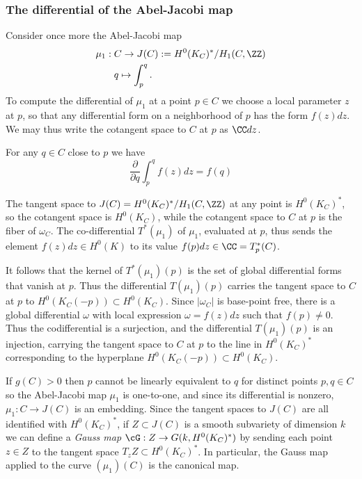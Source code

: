 \subsubsection{The differential of the Abel-Jacobi map}\label{Abel-Jacobi differential}

Consider once more the  Abel-Jacobi map
$$
\begin{aligned}
\mu_1 : \; &C \to J(C) := H^0(K_C)^*/H_1(C, \ZZ) \\
&q \mapsto \int_p^q .
\end{aligned}
$$
To compute the differential of $\mu_1$ at a point $p\in C$ we choose a local parameter $z$ at $p$, so that  any differential form on a neighborhood of $p$ has the form $f(z)dz$. We may thus write the cotangent space to $C$ at $p$ as $\CC dz$.

 For any $q\in C$ close to $p$ we have
$$
\frac{\partial}{\partial q} \int_p^q f(z)dz = f(q)
$$

The tangent space to $J(C) =  H^0(K_C)^*/H_1(C, \ZZ)$ at any point is $H^0(K_C)^*$, so the cotangent space is $H^0(K_C)$, while the cotangent space to $C$ at $p$ is the fiber of $\omega_C$.
The co-differential 
$T^*(\mu_1)$ of $\mu_1$, evaluated at $p$, thus sends the element $f(z) dz\in H^0(K)$ to its value
$f(p)dz \in \CC = T^*_p(C)$. 

It follows that
the kernel of $T^*(\mu_1)(p)$ is  the set of global differential forms that vanish at $p$. Thus the differential $T(\mu_1)(p)$ carries the tangent space to $C$ at $p$ to $H^0(K_C(-p)) \subset H^0(K_C)$. Since $|\omega_C|$ is  base-point free, there is a global differential $\omega$ 
with local expression $\omega = f(z)dz$ such that $f(p) \neq 0$. Thus the codifferential is a surjection, and  the
differential $T(\mu_1)(p)$ is an injection, carrying the tangent space to $C$ at $p$ to the line
in $H^0(K_C)^*$ corresponding to the hyperplane $H^0(K_C(-p))\subset H^0(K_C)$.

If $g(C)>0$ then $p$ cannot be linearly equivalent to $q$ for distinct points $p, q \in C$ so the Abel-Jacobi map $\mu_1$ is one-to-one, and since its differential is nonzero, $\mu_1 : C \to J(C)$ is an embedding. Since the tangent spaces to $J(C)$ are all identified with $H^0(K_C)^*$, if $Z \subset J(C)$ is a smooth subvariety of dimension $k$ we can define a \emph{Gauss map} $\cG : Z \to G(k, H^0(K_C)^*)$ by sending each point $z \in Z$ to the tangent space $T_zZ\subset H^0(K_C)^*$.
In particular, the Gauss map applied to the curve $(\mu_1)(C)$ is the canonical map.


